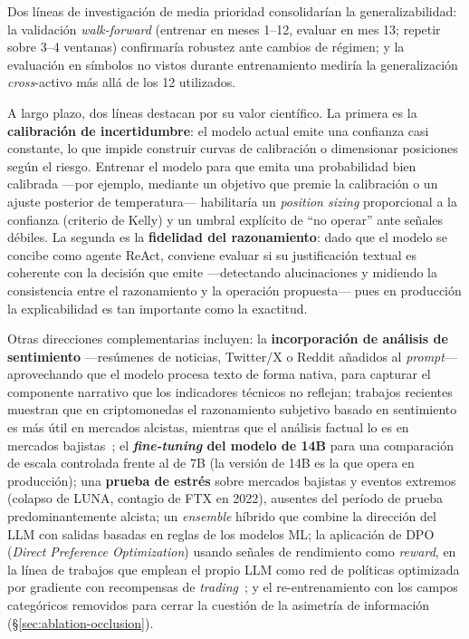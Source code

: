 \documentclass[10pt,twocolumn]{article}
\begin{document}
Dos l\'ineas de investigaci\'on de media prioridad consolidar\'ian la generalizabilidad: la validaci\'on \textit{walk-forward} (entrenar en meses 1--12, evaluar en mes 13; repetir sobre 3--4 ventanas) confirmar\'ia robustez ante cambios de r\'egimen; y la evaluaci\'on en s\'imbolos no vistos durante entrenamiento medir\'ia la generalizaci\'on \textit{cross}-activo m\'as all\'a de los 12 utilizados.

A largo plazo, dos l\'ineas destacan por su valor cient\'ifico. La primera es la \textbf{calibraci\'on de incertidumbre}: el modelo actual emite una confianza casi constante, lo que impide construir curvas de calibraci\'on o dimensionar posiciones seg\'un el riesgo. Entrenar el modelo para que emita una probabilidad bien calibrada ---por ejemplo, mediante un objetivo que premie la calibraci\'on o un ajuste posterior de temperatura--- habilitar\'ia un \textit{position sizing} proporcional a la confianza (criterio de Kelly) y un umbral expl\'icito de ``no operar'' ante se\~nales d\'ebiles. La segunda es la \textbf{fidelidad del razonamiento}: dado que el modelo se concibe como agente ReAct, conviene evaluar si su justificaci\'on textual es coherente con la decisi\'on que emite ---detectando alucinaciones y midiendo la consistencia entre el razonamiento y la operaci\'on propuesta--- pues en producci\'on la explicabilidad es tan importante como la exactitud.

Otras direcciones complementarias incluyen: la \textbf{incorporaci\'on de an\'alisis de sentimiento} ---res\'umenes de noticias, Twitter/X o Reddit a\~nadidos al \textit{prompt}--- aprovechando que el modelo procesa texto de forma nativa, para capturar el componente narrativo que los indicadores t\'ecnicos no reflejan; trabajos recientes muestran que en criptomonedas el razonamiento subjetivo basado en sentimiento es m\'as \'util en mercados alcistas, mientras que el an\'alisis factual lo es en mercados bajistas~\cite{wang2024factsubj}; el \textbf{\textit{fine-tuning} del modelo de 14B} para una comparaci\'on de escala controlada frente al de 7B (la versi\'on de 14B es la que opera en producci\'on); una \textbf{prueba de estr\'es} sobre mercados bajistas y eventos extremos (colapso de LUNA, contagio de FTX en 2022), ausentes del per\'iodo de prueba predominantemente alcista; un \textit{ensemble} h\'ibrido que combine la direcci\'on del LLM con salidas basadas en reglas de los modelos ML; la aplicaci\'on de DPO (\textit{Direct Preference Optimization}) usando se\~nales de rendimiento como \textit{reward}, en la l\'inea de trabajos que emplean el propio LLM como red de pol\'iticas optimizada por gradiente con recompensas de \textit{trading}~\cite{xiong2025flagtrader}; y el re-entrenamiento con los campos categ\'oricos removidos para cerrar la cuesti\'on de la asimetr\'ia de informaci\'on (\S\ref{sec:ablation-occlusion}).
\end{document}
